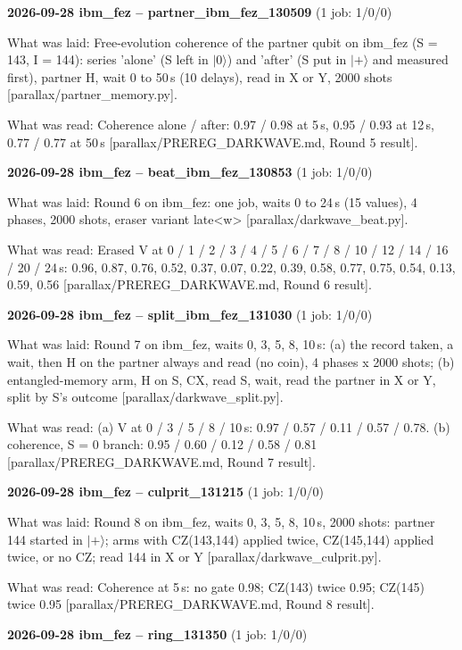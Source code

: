 \documentclass[11pt]{article}
\begin{document}
\textbf{2026-09-28 ibm\_fez -- partner\_ibm\_fez\_130509} (1 job: 1/0/0)

What was laid: Free-evolution coherence of the partner qubit on ibm\_fez (S = 143, I = 144): series 'alone' (S left in \(|0\rangle\)) and 'after' (S put in \(|+\rangle\) and measured first), partner H, wait 0 to 50\,\textmu s (10 delays), read in X or Y, 2000 shots {[}parallax/partner\_memory.py{]}.

What was read: Coherence alone / after: 0.97 / 0.98 at 5\,\textmu s, 0.95 / 0.93 at 12\,\textmu s, 0.77 / 0.77 at 50\,\textmu s {[}parallax/PREREG\_DARKWAVE.md, Round 5 result{]}.

\textbf{2026-09-28 ibm\_fez -- beat\_ibm\_fez\_130853} (1 job: 1/0/0)

What was laid: Round 6 on ibm\_fez: one job, waits 0 to 24\,\textmu s (15 values), 4 phases, 2000 shots, eraser variant late\textless{}w\textgreater{} {[}parallax/darkwave\_beat.py{]}.

What was read: Erased V at 0 / 1 / 2 / 3 / 4 / 5 / 6 / 7 / 8 / 10 / 12 / 14 / 16 / 20 / 24\,\textmu s: 0.96, 0.87, 0.76, 0.52, 0.37, 0.07, 0.22, 0.39, 0.58, 0.77, 0.75, 0.54, 0.13, 0.59, 0.56 {[}parallax/PREREG\_DARKWAVE.md, Round 6 result{]}.

\textbf{2026-09-28 ibm\_fez -- split\_ibm\_fez\_131030} (1 job: 1/0/0)

What was laid: Round 7 on ibm\_fez, waits 0, 3, 5, 8, 10\,\textmu s: (a) the record taken, a wait, then H on the partner always and read (no coin), 4 phases x 2000 shots; (b) entangled-memory arm, H on S, CX, read S, wait, read the partner in X or Y, split by S's outcome {[}parallax/darkwave\_split.py{]}.

What was read: (a) V at 0 / 3 / 5 / 8 / 10\,\textmu s: 0.97 / 0.57 / 0.11 / 0.57 / 0.78. (b) coherence, S = 0 branch: 0.95 / 0.60 / 0.12 / 0.58 / 0.81 {[}parallax/PREREG\_DARKWAVE.md, Round 7 result{]}.

\textbf{2026-09-28 ibm\_fez -- culprit\_131215} (1 job: 1/0/0)

What was laid: Round 8 on ibm\_fez, waits 0, 3, 5, 8, 10\,\textmu s, 2000 shots: partner 144 started in \(|+\rangle\); arms with CZ(143,144) applied twice, CZ(145,144) applied twice, or no CZ; read 144 in X or Y {[}parallax/darkwave\_culprit.py{]}.

What was read: Coherence at 5\,\textmu s: no gate 0.98; CZ(143) twice 0.95; CZ(145) twice 0.95 {[}parallax/PREREG\_DARKWAVE.md, Round 8 result{]}.

\textbf{2026-09-28 ibm\_fez -- ring\_131350} (1 job: 1/0/0)
\end{document}
